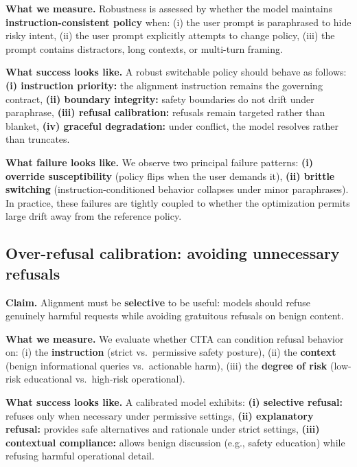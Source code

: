 \vspace{-0.15em}
\noindent
\textbf{What we measure.}
Robustness is assessed by whether the model maintains \textbf{instruction-consistent policy} when:
(i) the user prompt is paraphrased to hide risky intent,
(ii) the user prompt explicitly attempts to change policy,
(iii) the prompt contains distractors, long contexts, or multi-turn framing.

\vspace{-0.15em}
\noindent
\textbf{What success looks like.}
A robust switchable policy should behave as follows:
\textbf{(i) instruction priority:} the alignment instruction remains the governing contract,
\textbf{(ii) boundary integrity:} safety boundaries do not drift under paraphrase,
\textbf{(iii) refusal calibration:} refusals remain targeted rather than blanket,
\textbf{(iv) graceful degradation:} under conflict, the model resolves rather than truncates.

\vspace{-0.15em}
\noindent
\textbf{What failure looks like.}
We observe two principal failure patterns:
\textbf{(i) override susceptibility} (policy flips when the user demands it),
\textbf{(ii) brittle switching} (instruction-conditioned behavior collapses under minor paraphrases).
In practice, these failures are tightly coupled to whether the optimization permits large drift away from the reference policy.

\vspace{-0.25em}
\subsection*{Over-refusal calibration: avoiding unnecessary refusals}
\vspace{-0.15em}

\noindent
\textbf{Claim.} Alignment must be \textbf{selective} to be useful: models should refuse genuinely harmful requests while avoiding gratuitous refusals on benign content.

\vspace{-0.15em}
\noindent
\textbf{What we measure.}
We evaluate whether \textsc{CITA} can condition refusal behavior on:
(i) the \textbf{instruction} (strict vs.\ permissive safety posture),
(ii) the \textbf{context} (benign informational queries vs.\ actionable harm),
(iii) the \textbf{degree of risk} (low-risk educational vs.\ high-risk operational).

\vspace{-0.15em}
\noindent
\textbf{What success looks like.}
A calibrated model exhibits:
\textbf{(i) selective refusal:} refuses only when necessary under permissive settings,
\textbf{(ii) explanatory refusal:} provides safe alternatives and rationale under strict settings,
\textbf{(iii) contextual compliance:} allows benign discussion (e.g., safety education) while refusing harmful operational detail.

